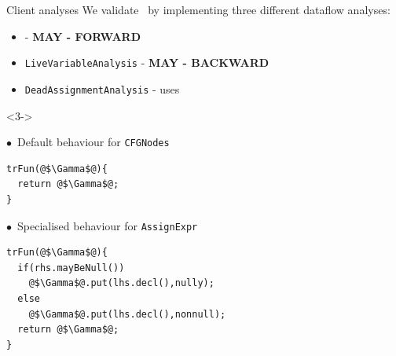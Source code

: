 \begin{frame}[fragile]{Client analyses}
    We validate \intrajs\ by implementing three different dataflow analyses:
    \begin{itemize}\small
        \item {} -  \hfill \textbf{MAY - FORWARD }
        \item \texttt{LiveVariableAnalysis} -  \hfill \textbf{MAY - BACKWARD}
        \item \texttt{DeadAssignmentAnalysis} -  \hfill uses 
    \end{itemize}
\vspace{0.5cm}
\hspace{-0.8cm}
	    \begin{minipage}[h]{0.4\textwidth}
    \end{minipage}\hfill%
	    \begin{minipage}[h]{0.5\textwidth}
\begin{onlyenv}<3->


\footnotesize
$\bullet$\ Default behaviour for \texttt{CFGNodes}
\begin{lstlisting}[frame=none,language=JastAdd]
trFun(@$\Gamma$@){
  return @$\Gamma$@;
}
\end{lstlisting}
 $\bullet$\ Specialised behaviour for \texttt{AssignExpr}
\begin{lstlisting}[frame=none, language=JastAdd]
trFun(@$\Gamma$@){
  if(rhs.mayBeNull())
    @$\Gamma$@.put(lhs.decl(),nully);
  else
    @$\Gamma$@.put(lhs.decl(),nonnull);
  return @$\Gamma$@;
}
\end{lstlisting}

\end{onlyenv}
    \end{minipage}%

\end{frame}
